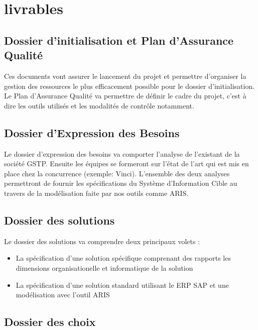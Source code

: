 \section{livrables}

\subsection{Dossier d'initialisation et Plan d'Assurance Qualité}

Ces documents vont assurer le lancement du projet et permettre d'organiser la gestion des ressources le plus efficacement possible pour le dossier d'initialisation.
Le Plan d'Assurance Qualité va permettre de définir le cadre du projet, c'est à dire les outils utilisés et les modalités de contrôle notamment. 

\subsection{Dossier d'Expression des Besoins}

Le dossier d'expression des besoins va comporter l'analyse de l'existant de la société GSTP. Ensuite les équipes se formeront sur l'état de l'art qui est mis en place chez la concurrence (exemple: Vinci). L'ensemble des deux analyses permettront de fournir les spécifications du Système d'Information Cible au travers de la modélisation faite par nos outils comme ARIS. 

\subsection{Dossier des solutions}

Le dossier des solutions va comprendre deux principaux volets :
\begin{itemize}
\item La spécification d'une solution spécifique comprenant des rapports les dimensions organisationelle et informatique de la solution
\item La spécification d'une solution standard utilisant le ERP SAP et une modélisation avec l'outil ARIS
\end{itemize}

\subsection{Dossier des choix}

